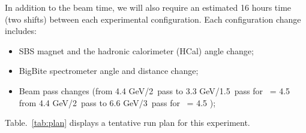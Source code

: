 In addition to the beam time, we will also require an estimated 16 hours time (two shifts) between each experimental configuration.
Each configuration change includes:
%
\begin{itemize}
\item{SBS magnet and the hadronic calorimeter (HCal) angle change;}
\item{BigBite spectrometer angle and distance change;}
\item{Beam pass changes (from 4.4 GeV/2~pass to 3.3 GeV/1.5~pass for \qsq~= 4.5 \gevcsq  from 4.4 GeV/2~pass to 6.6 GeV/3~pass for \qsq~= 4.5 \gevcsq);}
\end{itemize}
%
Table.~\ref{tab:plan} displays a tentative run plan for this experiment. %
%
